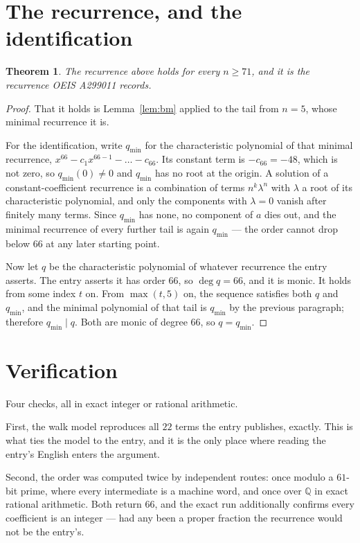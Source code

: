 \documentclass[11pt,a4paper]{article}
\theoremstyle{plain}
\newtheorem{theorem}{Theorem}
\theoremstyle{definition}
\begin{document}
\section{The recurrence, and the identification}

\begin{theorem}
The recurrence above holds for every $n\ge71$, and it is the recurrence OEIS A299011 records.
\end{theorem}

\begin{proof}
That it holds is Lemma~\ref{lem:bm} applied to the tail from $n=5$, whose minimal
recurrence it is.

For the identification, write $q_{\min}$ for the characteristic polynomial of that minimal
recurrence, $x^{66}-c_1x^{66-1}-\dots-c_{66}$. Its constant term is
$-c_{66}=-48$, which is not zero, so $q_{\min}(0)\neq0$ and $q_{\min}$ has no
root at the origin. A solution of a constant-coefficient recurrence is a combination of terms
$n^{k}\lambda^{n}$ with $\lambda$ a root of its characteristic polynomial, and only the
components with $\lambda=0$ vanish after finitely many terms. Since $q_{\min}$ has none, no
component of $a$ dies out, and the minimal recurrence of every further tail is again
$q_{\min}$ --- the order cannot drop below $66$ at any later starting point.

Now let $q$ be the characteristic polynomial of whatever recurrence the entry asserts. The
entry asserts it has order $66$, so $\deg q=66$, and it is monic. It holds from some
index $t$ on. From $\max(t,5)$ on, the sequence satisfies both $q$ and $q_{\min}$, and
the minimal polynomial of that tail is $q_{\min}$ by the previous paragraph; therefore
$q_{\min}\mid q$. Both are monic of degree $66$, so $q=q_{\min}$.
\end{proof}

\section{Verification}

Four checks, all in exact integer or rational arithmetic.

First, the walk model reproduces all $22$ terms the entry publishes, exactly. This is
what ties the model to the entry, and it is the only place where reading the entry's English
enters the argument.

Second, the order was computed twice by independent routes: once modulo a $61$-bit prime, where
every intermediate is a machine word, and once over $\mathbb{Q}$ in exact rational arithmetic.
Both return $66$, and the exact run additionally confirms every coefficient is an integer
--- had any been a proper fraction the recurrence would not be the entry's.
\end{document}
